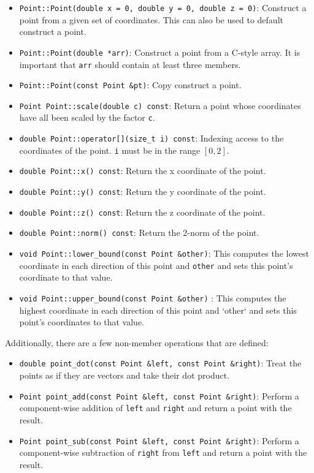 \documentclass[11pt]{book}
\begin{document}
\begin{itemize} 
 \item {\tt Point::Point(double x = 0, double y = 0, double z = 0)}: Construct a
 point from a given set of coordinates. This can also be used to default
 construct a point.
 \item {\tt Point::Point(double *arr)}: Construct a point from a C-style
   array. It is  important that {\tt arr} should contain at least three members.
 \item  {\tt Point::Point(const Point \&pt)}: Copy construct a point.
 \item {\tt Point Point::scale(double c) const}: Return a point whose
   coordinates have  all been scaled by the factor {\tt c}.
 \item {\tt double Point::operator[](size\_t i) const}: Indexing access to the
 coordinates of the point. {\tt i} must be in the range $[0,2]$.
 \item  {\tt double Point::x() const}: Return the x coordinate of the point.
 \item  {\tt double Point::y() const}: Return the y coordinate of the point.
 \item {\tt double Point::z() const}: Return the z coordinate of the point.
 \item  {\tt double Point::norm() const}: Return the 2-norm of the point.
 \item {\tt void Point::lower\_bound(const Point \&other)}: This computes the
   lowest  coordinate in each direction of this point and {\tt other} and sets
   this point's  coordinate to that value.
 \item {\tt void Point::upper\_bound(const Point \&other)} : This computes the
   highest coordinate in each direction of this point and `other` and sets this
   point's  coordinates to that value.
\end{itemize} 

Additionally, there are a few non-member operations that are defined:

\begin{itemize}
 \item {\tt double point\_dot(const Point \&left, const Point \&right)}: Treat
   the  points as if they are vectors and take their dot product.
 \item {\tt Point point\_add(const Point \&left, const Point \&right)}: Perform
   a  component-wise addition of {\tt left} and {\tt right} and return a point
   with  the result.
 \item {\tt Point point\_sub(const Point \&left, const Point \&right)}: 
Perform a component-wise subtraction of {\tt right} from {\tt left} and return a
point  with  the result.
\end{itemize}
\end{document}
